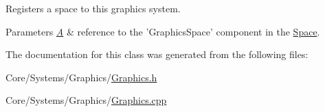 Registers a space to this graphics system. 


\begin{DoxyParams}{Parameters}
{\em \hyperlink{classA}{A}} & reference to the 'Graphics\-Space' component in the \hyperlink{classDCEngine_1_1Space}{Space}. \\
\hline
\end{DoxyParams}


The documentation for this class was generated from the following files\-:\begin{DoxyCompactItemize}
\item 
Core/\-Systems/\-Graphics/\hyperlink{Graphics_8h}{Graphics.\-h}\item 
Core/\-Systems/\-Graphics/\hyperlink{Graphics_8cpp}{Graphics.\-cpp}\end{DoxyCompactItemize}
